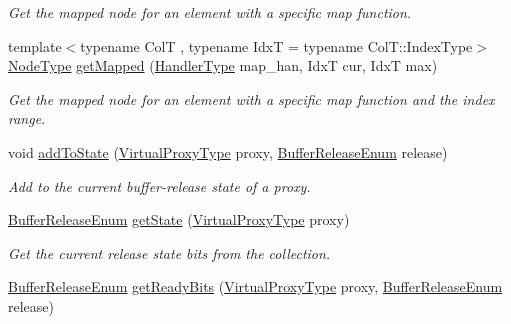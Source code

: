 \begin{DoxyCompactItemize}
\begin{DoxyCompactList}\small\item\em Get the mapped node for an element with a specific map function. \end{DoxyCompactList}\item 
{\footnotesize template$<$typename ColT , typename IdxT  = typename Col\+T\+::\+Index\+Type$>$ }\\\hyperlink{namespacevt_a866da9d0efc19c0a1ce79e9e492f47e2}{Node\+Type} \hyperlink{structvt_1_1vrt_1_1collection_1_1_collection_manager_a59cb33eb7e68fc9625a35ccf654de4ff}{get\+Mapped} (\hyperlink{namespacevt_af64846b57dfcaf104da3ef6967917573}{Handler\+Type} map\+\_\+han, IdxT cur, IdxT max)
\begin{DoxyCompactList}\small\item\em Get the mapped node for an element with a specific map function and the index range. \end{DoxyCompactList}\item 
void \hyperlink{structvt_1_1vrt_1_1collection_1_1_collection_manager_ae3dd7660105118c1ee14a125104313c6}{add\+To\+State} (\hyperlink{namespacevt_a1b417dd5d684f045bb58a0ede70045ac}{Virtual\+Proxy\+Type} proxy, \hyperlink{namespacevt_1_1vrt_1_1collection_a2545006e681bacc1f00be9d5d6bdc8fa}{Buffer\+Release\+Enum} release)
\begin{DoxyCompactList}\small\item\em Add to the current buffer-\/release state of a proxy. \end{DoxyCompactList}\item 
\hyperlink{namespacevt_1_1vrt_1_1collection_a2545006e681bacc1f00be9d5d6bdc8fa}{Buffer\+Release\+Enum} \hyperlink{structvt_1_1vrt_1_1collection_1_1_collection_manager_a9ee1d50fcf5ad149307c467bdd49de0a}{get\+State} (\hyperlink{namespacevt_a1b417dd5d684f045bb58a0ede70045ac}{Virtual\+Proxy\+Type} proxy)
\begin{DoxyCompactList}\small\item\em Get the current release state bits from the collection. \end{DoxyCompactList}\item 
\hyperlink{namespacevt_1_1vrt_1_1collection_a2545006e681bacc1f00be9d5d6bdc8fa}{Buffer\+Release\+Enum} \hyperlink{structvt_1_1vrt_1_1collection_1_1_collection_manager_aa6872852acd04a94e2bff5addad2ad06}{get\+Ready\+Bits} (\hyperlink{namespacevt_a1b417dd5d684f045bb58a0ede70045ac}{Virtual\+Proxy\+Type} proxy, \hyperlink{namespacevt_1_1vrt_1_1collection_a2545006e681bacc1f00be9d5d6bdc8fa}{Buffer\+Release\+Enum} release)

\end{DoxyCompactItemize}
